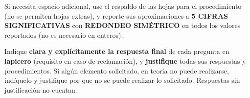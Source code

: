 \documentclass[12pt]{article}
\begin{document}
Si necesita espacio adicional, use el respaldo de las hojas para el procedimiento (no se permiten hojas extras), y reporte sus aproximaciones a \textbf{5 CIFRAS SIGNIFICATIVAS} con \textbf{REDONDEO SIMÉTRICO} en todos los valores reportados (no es necesario en enteros).

Indique \textbf{clara y explícitamente la respuesta final} de cada pregunta en \textbf{lapicero} (requisito en caso de reclamación), y \textbf{justifique} todas sus respuestas y procedimientos. Si algún elemento solicitado, en teoría no puede realizarse, indíquelo y justifique por que no se puede realizar lo solicitado. Respuestas sin justificación no cuentan.

\end{document}
